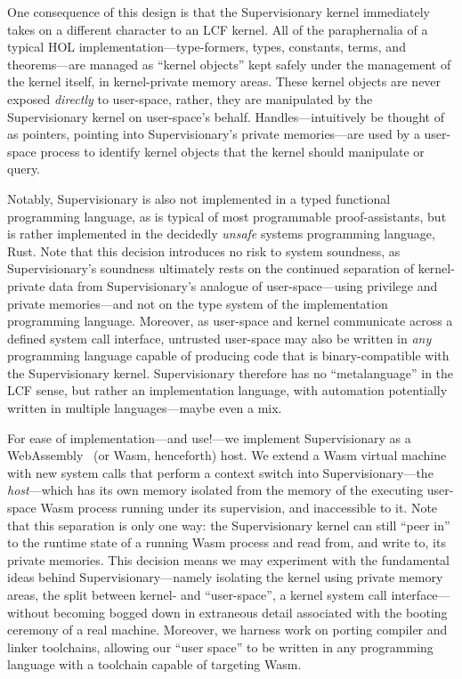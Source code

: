 \documentclass[a4paper, UKenglish, cleveref, autoref, thm-restate, colorlinks]{lipics-v2021}
\begin{document}
One consequence of this design is that the Supervisionary kernel immediately takes on a different character to an LCF kernel.
All of the paraphernalia of a typical HOL implementation---type-formers, types, constants, terms, and theorems---are managed as ``kernel objects'' kept safely under the management of the kernel itself, in kernel-private memory areas.
These kernel objects are never exposed \emph{directly} to user-space, rather, they are manipulated by the Supervisionary kernel on user-space's behalf.
Handles---intuitively be thought of as pointers, pointing into Supervisionary's private memories---are used by a user-space process to identify kernel objects that the kernel should manipulate or query.

Notably, Supervisionary is also not implemented in a typed functional programming language, as is typical of most programmable proof-assistants, but is rather implemented in the decidedly \emph{unsafe} systems programming language, Rust.
Note that this decision introduces no risk to system soundness, as Supervisionary's soundness ultimately rests on the continued separation of kernel-private data from Supervisionary's analogue of user-space---using privilege and private memories---and not on the type system of the implementation programming language.
Moreover, as user-space and kernel communicate across a defined system call interface, untrusted user-space may also be written in \emph{any} programming language capable of producing code that is binary-compatible with the Supervisionary kernel.
Supervisionary therefore has no ``metalanguage'' in the LCF sense, but rather an implementation language, with automation potentially written in multiple languages---maybe even a mix.

For ease of implementation---and use!---we implement Supervisionary as a WebAssembly~\cite{DBLP:conf/pldi/HaasRSTHGWZB17} (or Wasm, henceforth) host.
We extend a Wasm virtual machine with new system calls that perform a context switch into Supervisionary---the \emph{host}---which has its own memory isolated from the memory of the executing user-space Wasm process running under its supervision, and inaccessible to it.
Note that this separation is only one way: the Supervisionary kernel can still ``peer in'' to the runtime state of a running Wasm process and read from, and write to, its private memories.
This decision means we may experiment with the fundamental ideas behind Supervisionary---namely isolating the kernel using private memory areas, the split between kernel- and ``user-space'', a kernel system call interface---without becoming bogged down in extraneous detail associated with the booting ceremony of a real machine.
Moreover, we harness work on porting compiler and linker toolchains, allowing our ``user space'' to be written in any programming language with a toolchain capable of targeting Wasm.
\end{document}

